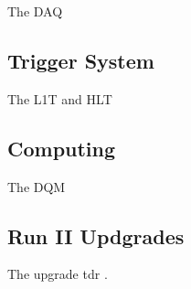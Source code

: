 The \gls{DAQ}

\subsection{Trigger System}
\label{SUBSECTION:ExperimentalApparatus_CMS_Trigger}

The \gls{L1T} and \gls{HLT}

\subsection{Computing}
\label{SUBSECTION:ExperimentalApparatus_CMS_Computing}

The \gls{DQM} 

\subsection{Run II Updgrades}
\label{SUBSECTION:ExperimentalApparatus_CMS_RUNII}

The upgrade tdr \cite{CMSTDR:CMSL1Upgrade}.
